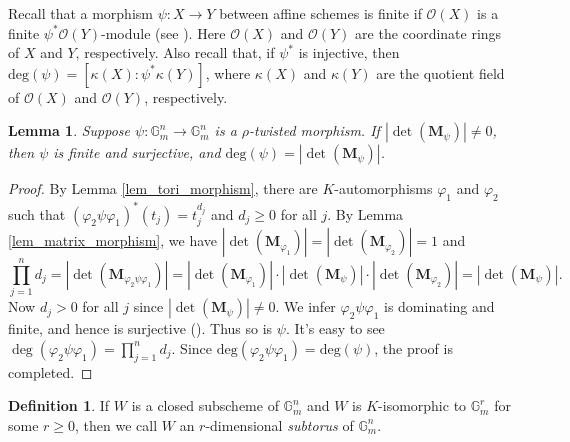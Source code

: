 \documentclass[12pt]{amsart}
\theoremstyle{plain}
\newtheorem{lemma}[theorem]{Lemma}
\theoremstyle{definition}
\newtheorem{definition}[theorem]{Definition}
\theoremstyle{question}
\theoremstyle{remark}
\theoremstyle{assumption}
\numberwithin{equation}{section}
\theoremstyle{bigthm}
\begin{document}
Recall that a morphism $\psi \colon  X \rightarrow Y$ between affine schemes is finite if $\mathcal{O} (X)$ is a finite $\psi^{*} \mathcal{O} (Y)$-module (see \cite[p.~124]{Mumford}). Here $\mathcal{O} (X)$ and $\mathcal{O} (Y)$ are the coordinate rings of $X$ and $Y$, respectively. Also recall that, if $\psi^{*}$ is injective, then $\mathrm{deg} (\psi) = [\kappa (X): \psi^{*} \kappa (Y)]$, where $\kappa (X)$ and $\kappa (Y)$ are the quotient field of $\mathcal{O} (X)$ and $\mathcal{O} (Y)$, respectively.
\begin{lemma}\label{lem_degree}
Suppose $\psi \colon  \mathbb{G}_{m}^{n} \rightarrow \mathbb{G}_{m}^{n}$ is a $\rho$-twisted morphism. If $|\det(\mathbf{M}_{\psi})| \neq 0$, then $\psi$ is finite and surjective, and $\mathrm{deg} (\psi) = |\det(\mathbf{M}_{\psi})|$.
\end{lemma}
\begin{proof}
By Lemma \ref{lem_tori_morphism}, there are $K$-automorphisms $\varphi_{1}$ and $\varphi_{2}$ such that $(\varphi_{2} \psi \varphi_{1})^{*} (t_{j}) = t_{j}^{d_{j}}$ and $d_{j} \ge 0$ for all $j$. By Lemma \ref{lem_matrix_morphism}, we have $|\det (\mathbf{M}_{\varphi_{1}})| = |\det (\mathbf{M}_{\varphi_{2}})| =1$ and
\[
\prod_{j=1}^{n} d_{j} = |\det (\mathbf{M}_{\varphi_{2} \psi \varphi_{1}})| = |\det (\mathbf{M}_{\varphi_{1}})| \cdot |\det (\mathbf{M}_{\psi})| \cdot |\det (\mathbf{M}_{\varphi_{2}})| = |\det (\mathbf{M}_{\psi})|.
\]
Now $d_{j} >0$ for all $j$ since $|\det(\mathbf{M}_{\psi})| \neq 0$. We infer $\varphi_{2} \psi \varphi_{1}$ is dominating and finite, and hence is surjective (\cite[p.~123,~Proposition~4]{Mumford}). Thus so is $\psi$. It's easy to see $\deg (\varphi_{2} \psi \varphi_{1}) = \prod_{j=1}^{n} d_{j}$. Since $\mathrm{deg} (\varphi_{2} \psi \varphi_{1}) = \mathrm{deg} (\psi)$, the proof is completed.
\end{proof}

\begin{definition}
If $W$ is a closed subscheme of $\mathbb{G}_{m}^{n}$ and $W$ is $K$-isomorphic to $\mathbb{G}_{m}^{r}$ for some $r \ge 0$, then we call $W$ an $r$-dimensional \textit{subtorus} of $\mathbb{G}_{m}^{n}$.
\end{definition}
\end{document}
